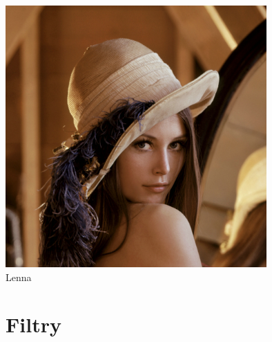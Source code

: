 \documentclass[a4paper,12pt,openany]{report}
\begin{document}
\begin{center}
\includegraphics[width=10cm]{resources/Lena.jpg}\\
\tiny{Lenna}
\end{center}

\chapter{Filtry}
\end{document}
